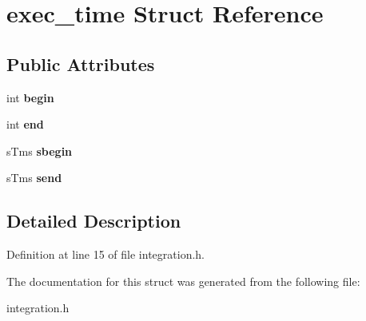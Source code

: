 \hypertarget{structexec__time}{
\section{exec\_\-time Struct Reference}
\label{structexec__time}
}
\subsection*{Public Attributes}
\begin{DoxyCompactItemize}
\item 
\hypertarget{structexec__time_a6729d466c89a3e7f89fdcde60bef9322}{
int {\bfseries begin}}
\label{structexec__time_a6729d466c89a3e7f89fdcde60bef9322}

\item 
\hypertarget{structexec__time_aed539f5582ac3f5a0a34bc163f93de4e}{
int {\bfseries end}}
\label{structexec__time_aed539f5582ac3f5a0a34bc163f93de4e}

\item 
\hypertarget{structexec__time_ad4220b41c0fdb9da6531a1a78851f405}{
sTms {\bfseries sbegin}}
\label{structexec__time_ad4220b41c0fdb9da6531a1a78851f405}

\item 
\hypertarget{structexec__time_a972f4e4cd8a78d425b25d764105ffca7}{
sTms {\bfseries send}}
\label{structexec__time_a972f4e4cd8a78d425b25d764105ffca7}

\end{DoxyCompactItemize}


\subsection{Detailed Description}


Definition at line 15 of file integration.h.



The documentation for this struct was generated from the following file:\begin{DoxyCompactItemize}
\item 
integration.h\end{DoxyCompactItemize}
